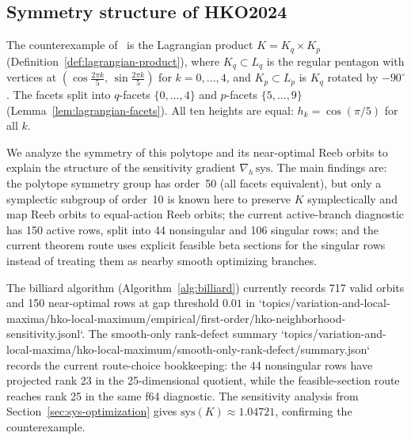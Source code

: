 %
%
%

\subsection{Symmetry structure of HKO2024}
\label{sec:hko-symmetry}

The counterexample of~\cite{HaimKislevOstrover2024} is the Lagrangian product
$K = K_q \times K_p$ (Definition~\ref{def:lagrangian-product}),
where $K_q \subset L_q$ is the regular pentagon with vertices at
$(\cos\tfrac{2\pi k}{5},\, \sin\tfrac{2\pi k}{5})$ for $k = 0, \ldots, 4$,
and $K_p \subset L_p$ is $K_q$ rotated by $-90^\circ$.
The facets split into $q$-facets $\{0, \ldots, 4\}$ and
$p$-facets $\{5, \ldots, 9\}$
(Lemma~\ref{lem:lagrangian-facets}).
All ten heights are equal:
$h_k = \cos(\pi/5)$ for all $k$.

We analyze the symmetry of this polytope and its near-optimal
Reeb orbits to explain the structure of the sensitivity gradient
$\nabla_h\,\mathrm{sys}$.
The main findings are:
the polytope symmetry group has order~50 (all facets equivalent),
but only a symplectic subgroup of order~10 is known here to preserve $K$
symplectically and map Reeb orbits to equal-action Reeb orbits;
the current active-branch diagnostic has 150 active rows, split into
44 nonsingular and 106 singular rows; and the current theorem route uses
explicit feasible beta sections for the singular rows instead of treating them
as nearby smooth optimizing branches.

The billiard algorithm
(Algorithm~\ref{alg:billiard}) currently records 717 valid orbits and
150 near-optimal rows at gap threshold $0.01$ in
`topics/variation-and-local-maxima/hko-local-maximum/empirical/first-order/hko-neighborhood-sensitivity.jsonl`.
The smooth-only rank-defect summary
`topics/variation-and-local-maxima/hko-local-maximum/smooth-only-rank-defect/summary.json`
records the current route-choice bookkeeping: the 44 nonsingular rows have
projected rank 23 in the 25-dimensional quotient, while the feasible-section
route reaches rank 25 in the same f64 diagnostic.
The sensitivity analysis from
Section~\ref{sec:sys-optimization} gives
$\mathrm{sys}(K) \approx 1.04721$, confirming the
counterexample.


